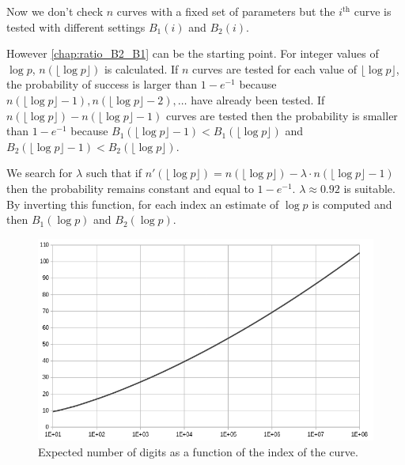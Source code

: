 \documentclass[a4paper, 11pt, pdftex]{report}
\theoremstyle{plain}
\theoremstyle{definition}
\begin{document}
Now we don't check $n$ curves with a fixed set of parameters but the $i^\text{th}$ curve
is tested with different settings $B_1(i)$ and $B_2(i)$.

However \autoref{chap:ratio_B2_B1} can be the starting point. For integer values of $\log p$,
$n(\lfloor\log p\rfloor)$ is calculated. If $n$ curves are tested for each value of
$\lfloor\log p\rfloor$, the probability of success is larger than $1 - e^{-1}$ because
$n(\lfloor\log p\rfloor - 1), n(\lfloor\log p\rfloor - 2), \ldots$ have already been tested.
If $n(\lfloor\log p\rfloor) - n(\lfloor\log p\rfloor - 1)$ curves are tested then
the probability is smaller than $1 - e^{-1}$ because
$B_1(\lfloor\log p\rfloor - 1) < B_1(\lfloor\log p\rfloor)$ and
$B_2(\lfloor\log p\rfloor - 1) < B_2(\lfloor\log p\rfloor)$.

We search for $\lambda$ such that if
$n'(\lfloor\log p\rfloor) = n(\lfloor\log p\rfloor) - \lambda \cdot n(\lfloor\log p\rfloor - 1)$
then the probability remains constant and equal to $1 - e^{-1}$. $\lambda \approx 0.92$ is
suitable. By inverting this function, for each index an estimate of $\log p$ is computed and
then $B_1(\log p)$ and $B_2(\log p)$.


\begin{figure}[!ht]
	\vspace*{1.0cm}
	\centering
	\includegraphics[width=15.5cm, angle=0]{img/digits_n.png}
	\caption{\label{fig:dgt_n} Expected number of digits as a function of the index of the curve.}
	\vspace*{1.0cm}
\end{figure}
\end{document}
